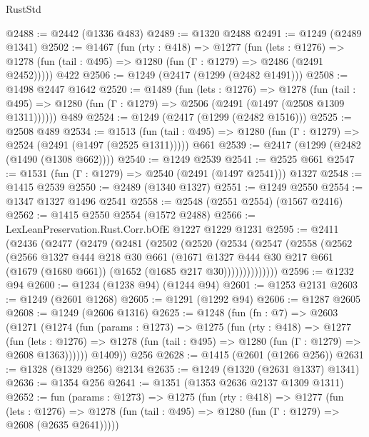 \begin{lexlean}{RustStd}
\begin{coremodule}
{\begin{coremodule}
{{{{{{{{{{{@2488 := @2442 (@1336 @483)
@2489 := @1320 @2488
@2491 := @1249 (@2489 @1341)
@2502 := @1467
    (fun (rty : @418) =>
    @1277
      (fun (lets : @1276) =>
      @1278 (fun (tail : @495) => @1280 (fun (Γ : @1279) => @2486 (@2491 @2452)))))
    @422
@2506 := @1249 (@2417 (@1299 (@2482 @1491)))
@2508 := @1498 @2447 @1642
@2520 := @1489
    (fun (lets : @1276) =>
    @1278
      (fun (tail : @495) => @1280 (fun (Γ : @1279) => @2506 (@2491 (@1497 (@2508 @1309 @1311))))))
    @489
@2524 := @1249 (@2417 (@1299 (@2482 @1516)))
@2525 := @2508 @489
@2534 := @1513
    (fun (tail : @495) => @1280 (fun (Γ : @1279) => @2524 (@2491 (@1497 (@2525 @1311)))))
    @661
@2539 := @2417 (@1299 (@2482 (@1490 (@1308 @662))))
@2540 := @1249 @2539
@2541 := @2525 @661
@2547 := @1531 (fun (Γ : @1279) => @2540 (@2491 (@1497 @2541))) @1327
@2548 := @1415 @2539
@2550 := @2489 (@1340 @1327)
@2551 := @1249 @2550
@2554 := @1347 @1327 @1496 @2541
@2558 := @2548 (@2551 @2554) (@1567 @2416)
@2562 := @1415 @2550 @2554 (@1572 @2488)
@2566 := LexLeanPreservation.Rust.Corr.bOfE @1227 @1229 @1231
@2595 := @2411
    (@2436
      (@2477
        (@2479
          (@2481
            (@2502
              (@2520
                (@2534
                  (@2547
                    (@2558
                      (@2562
                        (@2566
                          @1327
                          @444
                          @218
                          @30
                          @661
                          (@1671
                            @1327
                            @444
                            @30
                            @217
                            @661
                            (@1679 (@1680 @661))
                            (@1652 (@1685 @217 @30))))))))))))))
@2596 := @1232 @94
@2600 := @1234 (@1238 @94) (@1244 @94)
@2601 := @1253 @2131
@2603 := @1249 (@2601 @1268)
@2605 := @1291 (@1292 @94)
@2606 := @1287 @2605
@2608 := @1249 (@2606 @1316)
@2625 := @1248
    (fun (fn : @7) =>
    @2603
      (@1271
        (@1274
          (fun (params : @1273) =>
          @1275
            (fun (rty : @418) =>
            @1277
              (fun (lets : @1276) =>
              @1278 (fun (tail : @495) => @1280 (fun (Γ : @1279) => @2608 @1363))))))
        @1409))
    @256
@2628 := @1415 (@2601 (@1266 @256))
@2631 := @1328 (@1329 @256) @2134
@2635 := @1249 (@1320 (@2631 @1337) @1341)
@2636 := @1354 @256
@2641 := @1351 (@1353 @2636 @2137 @1309 @1311)
@2652 := fun (params : @1273) =>
  @1275
    (fun (rty : @418) =>
    @1277
      (fun (lets : @1276) =>
      @1278 (fun (tail : @495) => @1280 (fun (Γ : @1279) => @2608 (@2635 @2641)))))
}}}}}}}}}}}
\end{coremodule}}
\end{coremodule}
\end{lexlean}
